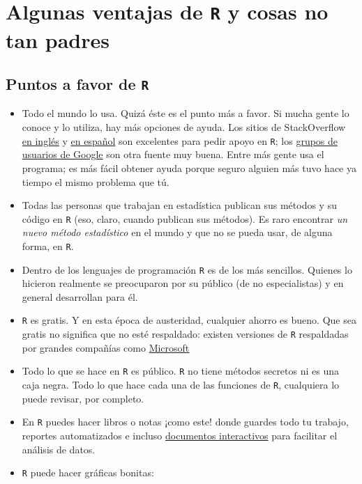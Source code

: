 \documentclass[
]{book}
\begin{document}
\hypertarget{algunas-ventajas-de-r-y-cosas-no-tan-padres}{%
\section{\texorpdfstring{Algunas ventajas de \texttt{R} y cosas no tan padres}{Algunas ventajas de R y cosas no tan padres}}\label{algunas-ventajas-de-r-y-cosas-no-tan-padres}}

\hypertarget{puntos-a-favor-de-r}{%
\subsection{\texorpdfstring{Puntos a favor de \texttt{R}}{Puntos a favor de R}}\label{puntos-a-favor-de-r}}

\begin{itemize}
\item
  Todo el mundo lo usa. Quizá éste es el punto más a favor. Si mucha gente lo conoce y lo utiliza, hay más opciones de ayuda. Los sitios de StackOverflow \href{https://stackoverflow.com}{en inglés} y \href{https://es.stackoverflow.com}{en español} son excelentes para pedir apoyo en \texttt{R}; los \href{https://groups.google.com/forum/\#!forum/r-help-archive}{grupos de usuarios de Google} son otra fuente muy buena. Entre más gente usa el programa; es más fácil obtener ayuda porque seguro alguien más tuvo hace ya tiempo el mismo problema que tú.
\item
  Todas las personas que trabajan en estadística publican sus métodos y su código en \texttt{R} (eso, claro, cuando publican sus métodos). Es raro encontrar \emph{un nuevo método estadístico} en el mundo y que no se pueda usar, de alguna forma, en \texttt{R}.
\item
  Dentro de los lenguajes de programación \texttt{R} es de los más sencillos. Quienes lo hicieron realmente se preocuparon por su público (de no especialistas) y en general desarrollan para él.
\item
  \texttt{R} es gratis. Y en esta época de austeridad, cualquier ahorro es bueno. Que sea gratis no significa que no esté respaldado: existen versiones de \texttt{R} respaldadas por grandes compañías como \href{https://mran.microsoft.com/open}{Microsoft}
\item
  Todo lo que se hace en \texttt{R} es público. \texttt{R} no tiene métodos secretos ni es una caja negra. Todo lo que hace cada una de las funciones de \texttt{R}, cualquiera lo puede revisar, por completo.
\item
  En \texttt{R} puedes hacer libros o notas ¡como este! donde guardes todo tu trabajo, reportes automatizados e incluso \href{https://gallery.shinyapps.io/086-bus-dashboard/}{documentos interactivos} para facilitar el análisis de datos.
\item
  \texttt{R} puede hacer gráficas bonitas:
\end{itemize}
\end{document}
